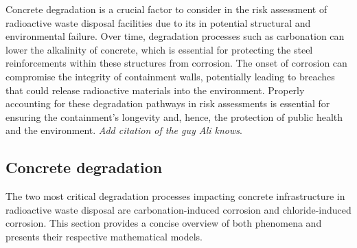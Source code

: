 
Concrete degradation is a crucial factor to consider in the risk assessment of radioactive waste disposal facilities due to its in potential structural and environmental failure. Over time, degradation processes such as carbonation can lower the alkalinity of concrete, which is essential for protecting the steel reinforcements within these structures from corrosion. The onset of corrosion can compromise the integrity of containment walls, potentially leading to breaches that could release radioactive materials into the environment. Properly accounting for these degradation pathways in risk assessments is essential for ensuring the containment's longevity and, hence, the protection of public health and the environment.
{{\textit{Add citation of the guy Ali knows}}}.

\subsection{Concrete degradation}
The two most critical degradation processes impacting concrete infrastructure in radioactive waste disposal are carbonation-induced corrosion and chloride-induced corrosion. This section provides a concise overview of both phenomena and presents their respective mathematical models.

